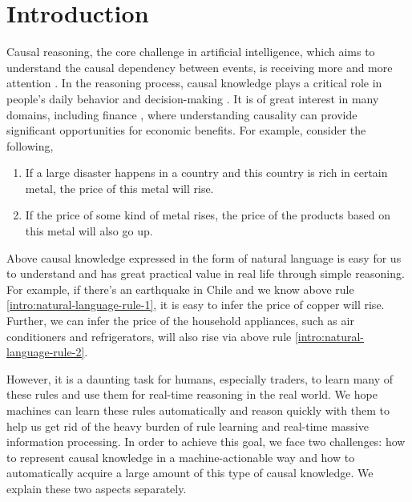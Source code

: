 \section{Introduction}
\label{sec:intro}
Causal reasoning, the core challenge in artificial intelligence, which aims to understand the causal dependency between events, is receiving more and more attention \cite{Pearl2009}.
In the reasoning process, causal knowledge plays a critical role in people's daily behavior and decision-making \cite{waldmann2013causal}.
It is of great interest in many domains, including finance \cite{Dunietz2017}, where understanding causality can provide significant opportunities for economic benefits. 
For example, consider the following,
\begin{enumerate}
	\item If a large disaster happens in a country and this country is rich in certain metal, the price of this metal will rise. \label{intro:natural-language-rule-1}
	\item If the price of some kind of metal rises, the price of the products based on this metal will also go up. \label{intro:natural-language-rule-2}
\end{enumerate}
Above causal knowledge expressed in the form of natural language is easy for us to understand and has great practical value in real life through simple reasoning. For example, if there's an earthquake in Chile and we know above rule \ref{intro:natural-language-rule-1}, it is easy to infer the price of copper will rise. Further, we can infer the price of the household appliances, such as air conditioners and refrigerators, will also rise via above rule \ref{intro:natural-language-rule-2}.

However, it is a daunting task for humans, especially traders, to learn many of these rules and use them for real-time reasoning in the real world.  
We hope machines can learn these rules automatically and reason quickly with them to help us get rid of the heavy burden of rule learning and real-time massive information processing. 
In order to achieve this goal, we face two challenges: how to represent causal knowledge in a machine-actionable way and how to automatically acquire a large amount of this type of causal knowledge. We explain these two aspects separately.
	
